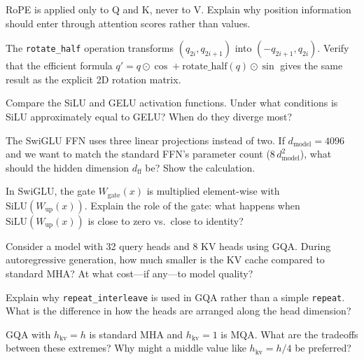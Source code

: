\begin{reviewquestion}[5]
  RoPE is applied only to Q and K, never to V. Explain why position
  information should enter through attention scores rather than values.
\end{reviewquestion}

\begin{reviewquestion}[6]
  The \texttt{rotate\_half} operation transforms $(q_{2i}, q_{2i+1})$
  into $(-q_{2i+1}, q_{2i})$. Verify that the efficient formula
  $q' = q \odot \cos + \text{rotate\_half}(q) \odot \sin$ gives the
  same result as the explicit 2D rotation matrix.
\end{reviewquestion}

\begin{reviewquestion}[7]
  Compare the SiLU and GELU activation functions. Under what conditions
  is SiLU approximately equal to GELU? When do they diverge most?
\end{reviewquestion}

\begin{reviewquestion}[8]
  The SwiGLU FFN uses three linear projections instead of two. If
  $d_{\text{model}} = 4096$ and we want to match the standard FFN's
  parameter count ($8\,d_{\text{model}}^2$), what should the hidden
  dimension $d_{\text{ff}}$ be? Show the calculation.
\end{reviewquestion}

\begin{reviewquestion}[9]
  In SwiGLU, the gate $W_{\text{gate}}(x)$ is multiplied element-wise
  with $\text{SiLU}(W_{\text{up}}(x))$. Explain the role of the gate:
  what happens when $\text{SiLU}(W_{\text{up}}(x))$ is close to zero
  vs.\ close to identity?
\end{reviewquestion}

\begin{reviewquestion}[10]
  Consider a model with 32 query heads and 8 KV heads using GQA.
  During autoregressive generation, how much smaller is the KV cache
  compared to standard MHA? At what cost---if any---to model quality?
\end{reviewquestion}

\begin{reviewquestion}[11]
  Explain why \texttt{repeat\_interleave} is used in GQA rather than
  a simple \texttt{repeat}. What is the difference in how the heads
  are arranged along the head dimension?
\end{reviewquestion}

\begin{reviewquestion}[12]
  GQA with $h_{\text{kv}} = h$ is standard MHA and $h_{\text{kv}} = 1$
  is MQA. What are the tradeoffs between these extremes? Why might a
  middle value like $h_{\text{kv}} = h/4$ be preferred?
\end{reviewquestion}


